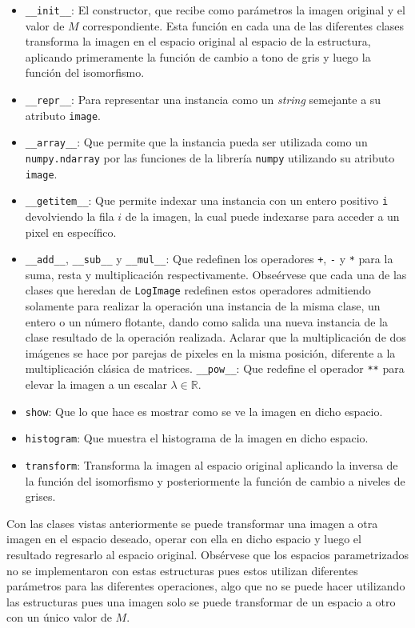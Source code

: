 \begin{itemize}
	\item \verb|__init__|: El constructor, que recibe como par\'ametros la imagen original y el valor de $M$ correspondiente. Esta funci\'on en cada una de las diferentes clases transforma la imagen en el espacio original al espacio de la estructura, aplicando primeramente la funci\'on de cambio a tono de gris y luego la funci\'on del isomorfismo.
	\item \verb|__repr__|: Para representar una instancia como un \textit{string} semejante a su atributo \verb|image|.
	\item \verb|__array__|: Que permite que la instancia pueda ser utilizada como un \verb|numpy.ndarray| por las funciones de la librer\'ia \verb|numpy| utilizando su atributo \verb|image|.
	\item \verb|__getitem__|: Que permite indexar una instancia con un entero positivo \verb|i| devolviendo la fila $i$ de la imagen, la cual puede indexarse para acceder a un pixel en espec\'ifico.
	\item \verb|__add__|, \verb|__sub__| y \verb|__mul__|: Que redefinen los operadores \verb|+|, \verb|-| y \verb|*| para la suma, resta y multiplicaci\'on respectivamente. Obse\'ervese que cada una de las clases que heredan de \verb|LogImage| redefinen estos operadores admitiendo solamente para realizar la operaci\'on una instancia de la misma clase, un entero o un n\'umero flotante, dando como salida una nueva instancia de la clase resultado de la operaci\'on realizada. Aclarar que la multiplicaci\'on de dos im\'agenes se hace por parejas de pixeles en la misma posici\'on, diferente a la multiplicaci\'on cl\'asica de matrices.
	\verb|__pow__|: Que redefine el operador \verb|**| para elevar la imagen a un escalar $\lambda\in \mathbb{R}$.
	\item \verb|show|: Que lo que hace es mostrar como se ve la imagen en dicho espacio.
	\item \verb|histogram|: Que muestra el histograma de la imagen en dicho espacio.
	\item \verb|transform|: Transforma la imagen al espacio original aplicando la inversa de la funci\'on del isomorfismo y posteriormente la funci\'on de cambio a niveles de grises.
\end{itemize}

Con las clases vistas anteriormente se puede transformar una imagen a otra imagen en el espacio deseado, operar con ella en dicho espacio y luego el resultado regresarlo al espacio original. Obs\'ervese que los espacios parametrizados no se implementaron con estas estructuras pues estos utilizan diferentes par\'ametros para las diferentes operaciones, algo que no se puede hacer utilizando las estructuras pues una imagen solo se puede transformar de un espacio a otro con un \'unico valor de $M$.

